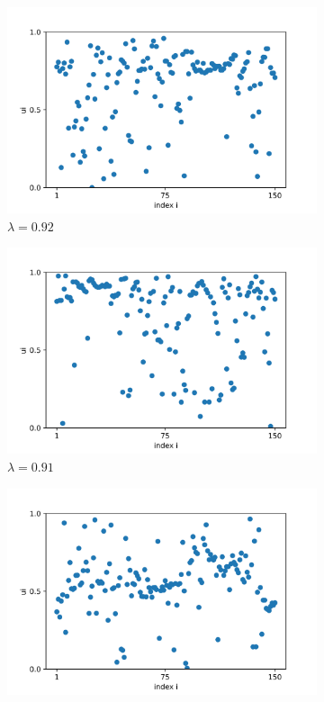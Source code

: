 \documentclass[a4paper,12pt]{article}
\begin{document}
\begin{figure}[H]
\begin{subfigure}{.32\textwidth}
  \includegraphics[width=1\linewidth]{u_lambda=0.92_t=2000}  
  \caption{$\lambda=0.92$}
\end{subfigure}
\begin{subfigure}{.32\textwidth}
  \centering
  \includegraphics[width=1\linewidth]{u_lambda=0.91_t=2000.png}  
  \caption{$\lambda=0.91$}
\end{subfigure}
\hfill
\begin{subfigure}{.32\textwidth}
  \centering
  \includegraphics[width=1\linewidth]{u_lambda=0.9_t=2000.png}  

\end{subfigure}
\end{figure}
\end{document}
